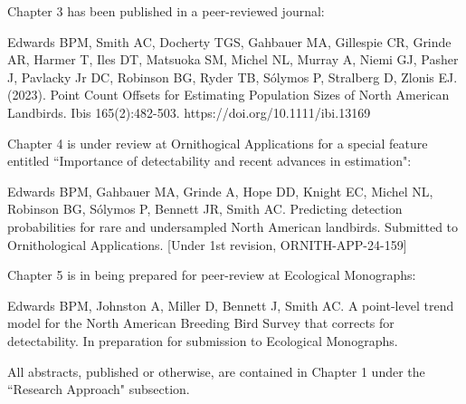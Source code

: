 \par Chapter 3 has been published in a peer-reviewed journal:

Edwards BPM, Smith AC, Docherty TGS, Gahbauer MA, Gillespie CR, Grinde AR, Harmer T, Iles DT, Matsuoka SM, Michel NL, Murray A, Niemi GJ, Pasher J, Pavlacky Jr DC, Robinson BG, Ryder TB, Sólymos P, Stralberg D, Zlonis EJ. (2023). Point Count Offsets for Estimating Population Sizes of North American Landbirds. Ibis 165(2):482-503. https://doi.org/10.1111/ibi.13169

\par Chapter 4 is under review at Ornithogical Applications for a special feature entitled ``Importance of detectability and recent advances in estimation":

Edwards BPM, Gahbauer MA, Grinde A, Hope DD, Knight EC, Michel NL, Robinson BG, Sólymos P, Bennett JR, Smith AC. Predicting detection probabilities for rare and undersampled North American landbirds. Submitted to Ornithological Applications. [Under 1st revision, ORNITH-APP-24-159]

\par Chapter 5 is in being prepared for peer-review at Ecological Monographs:

Edwards BPM, Johnston A, Miller D, Bennett J, Smith AC. A point-level trend model for the North American Breeding Bird Survey that corrects for detectability. In preparation for submission to Ecological Monographs.

\par All abstracts, published or otherwise, are contained in Chapter 1 under the ``Research Approach" subsection.



\clearpage

\tableofcontents

\listoffigures

\listoftables


\label{endfrontmatter} %
